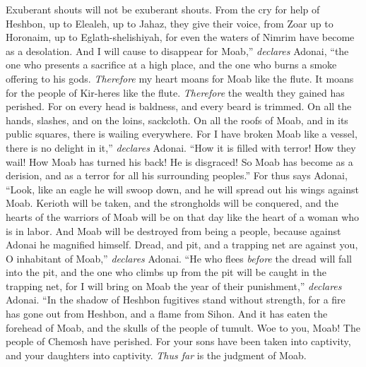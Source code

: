 \begin{biblechapter}
Exuberant shouts will not be exuberant shouts.
\verse From the cry for help of Heshbon, up to Elealeh, 
up to Jahaz, they give their voice, 
from Zoar up to Horonaim, up to Eglath-shelishiyah, 
for even the waters of Nimrim have become as a desolation.
\verse And I will cause to disappear for Moab,” \textit{declares} Adonai, 
“the one who presents a sacrifice at a high place, 
and the one who burns a smoke offering to his gods.
\verse \textit{Therefore} my heart moans for Moab like the flute. 
It moans for the people of Kir-heres like the flute. 
\textit{Therefore} the wealth they gained has perished.
\verse For on every head is baldness, 
and every beard is trimmed. 
On all the hands, slashes, 
and on the loins, sackcloth.
\verse On all the roofs of Moab, and in its public squares, 
there is wailing everywhere. 
For I have broken Moab like a vessel, 
there is no delight in it,” \textit{declares} Adonai.
\verse “How it is filled with terror! How they wail! 
How Moab has turned his back! He is disgraced! 
So Moab has become as a derision, 
and as a terror for all his surrounding peoples.”
\verse For thus says Adonai,
\verse “Look, like an eagle he will swoop down, 
and he will spread out his wings against Moab.
\verse Kerioth will be taken, 
and the strongholds will be conquered, 
and the hearts of the warriors of Moab will be on that day 
like the heart of a woman who is in labor.
\verse And Moab will be destroyed from being a people, 
because against Adonai he magnified himself.
\verse Dread, and pit, and a trapping net are against you, 
O inhabitant of Moab,” \textit{declares} Adonai.
\verse “He who flees \textit{before} the dread 
will fall into the pit, 
and the one who climbs up from the pit 
will be caught in the trapping net, 
for I will bring on Moab 
the year of their punishment,” \textit{declares} Adonai.
\verse “In the shadow of Heshbon 
fugitives stand without strength, 
for a fire has gone out from Heshbon, 
and a flame from Sihon. 
And it has eaten the forehead of Moab, 
and the skulls of the people of tumult.
\verse Woe to you, Moab! 
The people of Chemosh have perished. 
For your sons have been taken into captivity, 
and your daughters into captivity. \textit{Thus far} is the judgment of Moab.
\end{biblechapter}

